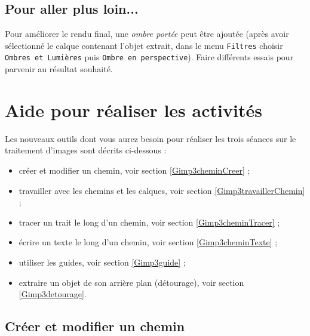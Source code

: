 \subsection{Pour aller plus loin...}

Pour améliorer le rendu final, une \emph{ombre portée} peut être ajoutée (après avoir sélectionné le calque contenant l'objet extrait, dans le menu \texttt{Filtres} choisir \texttt{Ombres et Lumières} puis \texttt{Ombre en perspective}). Faire différents essais pour parvenir au résultat souhaité.




\vfill







\newpage

\section{Aide pour réaliser les activités}\label{Image4eOutils}
 
Les nouveaux outils dont vous aurez besoin pour réaliser les trois séances sur le traitement d'images sont décrits ci-dessous :

\begin{itemize}
\item créer et modifier un chemin, voir section \vref{Gimp3cheminCreer} ;
\item travailler avec les chemins et les calques, voir section \vref{Gimp3travaillerChemin} ; 
\item tracer un trait le long d'un chemin, voir section \vref{Gimp3cheminTracer} ;
\item écrire un texte le long d'un chemin, voir section \vref{Gimp3cheminTexte} ;
\item utiliser les guides, voir section \vref{Gimp3guide} ;
\item extraire un objet de son arrière plan (détourage), voir section \vref{Gimp3detourage}.
\end{itemize}  


\subsection{Créer et modifier un chemin}\label{Gimp3cheminCreer} 

